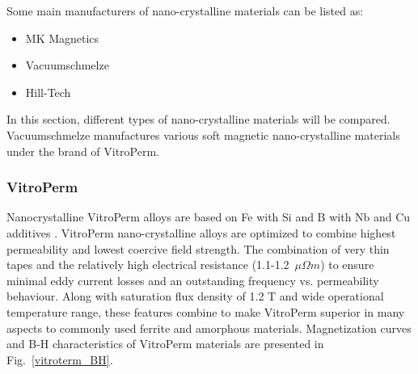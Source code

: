 \documentclass[a4paper, 11pt]{article} %
\begin{document}
Some main manufacturers of nano-crystalline materials can be listed as:

\begin{itemize}
  \item MK Magnetics
  \item Vacuumschmelze
  \item Hill-Tech
\end{itemize}

In this section, different types of nano-crystalline materials will be compared. 
Vacuumschmelze manufactures various soft magnetic nano-crystalline materials under the brand of VitroPerm.


\subsubsection*{VitroPerm}

Nanocrystalline VitroPerm alloys are based on Fe with Si and B with Nb and Cu additives \cite{vitroterm_manual}. VitroPerm nano-crystalline alloys are optimized to combine highest permeability and lowest coercive field strength. The combination of very thin tapes and the relatively high electrical resistance (1.1-1.2~$\mu \Omega m$) to ensure minimal eddy current losses and an outstanding frequency vs. permeability behaviour. Along with saturation flux density of 1.2 T and wide operational temperature range, these features combine to make VitroPerm  superior in many aspects to commonly used ferrite and amorphous materials. Magnetization curves and B-H characteristics of VitroPerm materials are presented in Fig.~\ref{vitroterm_BH}.
\end{document}
